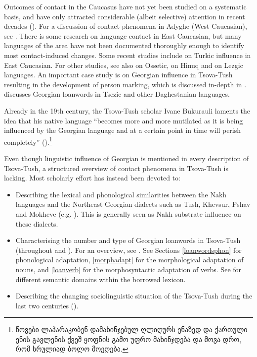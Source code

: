Outcomes of contact in the Caucasus have not yet been studied on a systematic basis, and have only attracted considerable (albeit selective) attention in recent decades (\cite[61]{dobrushinaetal2020overview}). For a discussion of contact phenomena in Adyghe (West Caucasian), see \textcite{hoehlig1997adyghecontact}. There is some research on language contact in East Caucasian, but many languages of the area have not been documented thoroughly enough to identify most contact-induced changes. Some recent studies include \textcite{johanson2006caucasus,dobrushina2017contactvolitional,authier2010kryzcopy,rindpawlow2023khinaluginfluence} on Turkic influence in East Caucasian.  For other studies, see also \textcite{belyaev2019contactossetic} on Ossetic, \textcite{forker19} on Hinuq and \textcite{maisak2019udicontact,maisak2019agulcontact,maisak2016lezgiccontact} on Lezgic languages. An important case study is \textcite{kojima19} on Georgian influence in Tsova-Tush resulting in the development of person marking, which is discussed in-depth in . \textcite{khalilov04contact} discusses Georgian loanwords in Tsezic and other Daghestanian languages.

Already in the 19th century, the Tsova-Tush scholar Ivane Bukurauli laments the idea that his native language ``becomes more and more mutilated as it is being influenced by the Georgian language and at a certain point in time will perish completely''  (\cite[43]{bukurauli1897moambe}).\footnote{\begin{otherlanguage}{georgian}წოვები ლაპარაკობენ დამახინჯებულ ღლიღურს ენაზედ და ქართული ენის გავლენის ქვეშ ყოფნის გამო უფრო მახინჯდება და მოვა დრო, რომ სრულიად ბოლო მოეღება.\end{otherlanguage}} %

Even though linguistic influence of Georgian is mentioned in every description of Tsova-Tush, a structured overview of contact phenomena in Tsova-Tush is lacking. Most scholarly effort has instead been devoted to:

\begin{itemize}
	\item Describing the lexical and phonological similarities between the Nakh languages and the Northeast Georgian dialects such as Tush, Khevsur, Pshav and Mokheve (e.g. \cite{kakashvilietym,uturgaidze1966mountainous,chincharauli2003parallels}). This is generally seen as Nakh substrate influence on these dialects.
	\item Characterising the number and type of Georgian loanwords in Tsova-Tush (throughout \cite{schiefner56} and \cite{desheriev53}). For an overview, see \textcite{faehnrich1998loanwords,WS,gippert08}. See Sections \ref{loanwordsphon} for phonological adaptation, \ref{morphadapt} for the morphological adaptation of nouns, and \ref{loanverb} for the morphosyntactic adaptation of verbs. See  for different semantic domains within the borrowed lexicon.
	\item Describing the changing sociolinguistic situation of the Tsova-Tush during the last two centuries (\cite{gigashvili16cs,gigashvili2014bi,gigashvili2014migration}).
\end{itemize} 

